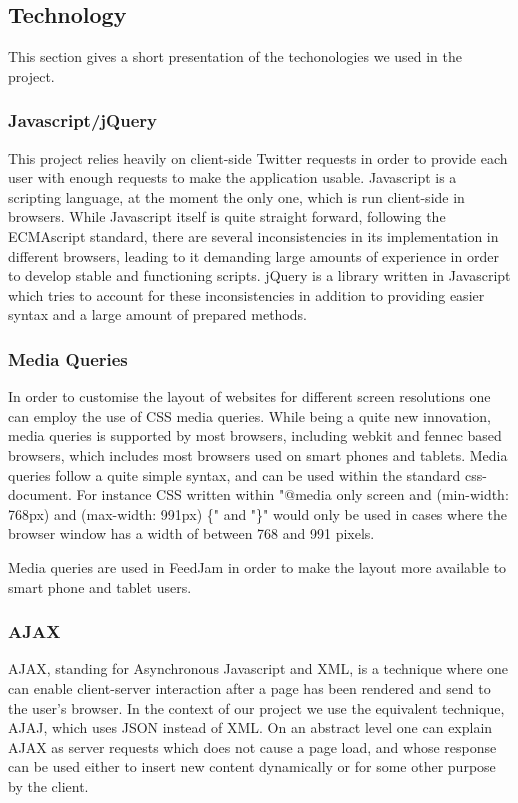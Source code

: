 
\subsection{Technology}
This section gives a short presentation of the techonologies we used in the project. 

\subsubsection{Javascript/jQuery} %
This project relies heavily on client-side Twitter requests in order to provide each user with enough requests to make the application usable. Javascript is a scripting language, at the moment the only one, which is run client-side in browsers. While Javascript itself is quite straight forward, following the ECMAscript standard, there are several inconsistencies in its implementation in different browsers, leading to it demanding large amounts of experience in order to develop stable and functioning scripts. jQuery is a library written in Javascript which tries to account for these inconsistencies in addition to providing easier syntax and a large amount of prepared methods.

\subsubsection{Media Queries} %
In order to customise the layout of websites for different screen resolutions one can employ the use of CSS media queries. While being a quite new innovation, media queries is supported by most browsers, including webkit and fennec based browsers, which includes most browsers used on smart phones and tablets. Media queries follow a quite simple syntax, and can be used within the standard css-document. For instance CSS written within "@media only screen and (min-width: 768px) and (max-width: 991px) \{" and "\}" would only be used in cases where the browser window has a width of between 768 and 991 pixels. 

Media queries are used in FeedJam in order to make the layout more available to smart phone and tablet users.

\subsubsection{AJAX}%
AJAX, standing for Asynchronous Javascript and XML, is a technique where one can enable client-server interaction after a page has been rendered and send to the user's browser. In the context of our project we use the equivalent technique, AJAJ, which uses JSON instead of XML. On an abstract level one can explain AJAX as server requests which does not cause a page load, and whose response can be used either to insert new content dynamically or for some other purpose by the client.

